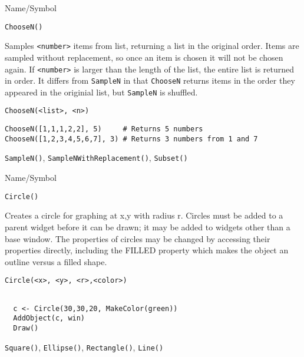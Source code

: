 \begin{desc}{Name/Symbol}
\item[Name/Symbol]  	\verb+ChooseN()+

\item[Description] Samples \verb+<number>+ items from list, returning
  a list in the original order. Items are sampled without replacement, so
  once an item is chosen it will not be chosen again. If
  \verb+<number>+ is larger than the length of the list, the entire
  list is returned in order.  It differs from \verb+SampleN+ in that
  \verb+ChooseN+ returns items in the order they appeared in the
  originial list, but \verb+SampleN+ is shuffled. 

\item[Usage]       	
\begin{verbatim}
ChooseN(<list>, <n>)
\end{verbatim}

\item[Example]   	
\begin{verbatim}
ChooseN([1,1,1,2,2], 5)     # Returns 5 numbers
ChooseN([1,2,3,4,5,6,7], 3) # Returns 3 numbers from 1 and 7
\end{verbatim}

\item[See Also]    	\verb+SampleN()+, \verb+SampleNWithReplacement()+, \verb+Subset()+
\end{desc}

\rl

\begin{desc}{Name/Symbol}
\item[Name/Symbol]	\verb+Circle()+

\item[Description] Creates a circle for graphing at x,y with radius r.
  Circles must be added to a parent widget before it can be drawn; it
  may be added to widgets other than a base window. The properties of
  circles may be changed by accessing their properties directly,
  including the FILLED property which makes the object an outline
  versus a filled shape.


\item[Usage]
\begin{verbatim}
Circle(<x>, <y>, <r>,<color>)
\end{verbatim}

\item[Example]	
\begin{verbatim}
  
  c <- Circle(30,30,20, MakeColor(green))
  AddObject(c, win)
  Draw()

\end{verbatim}
\item[See Also]	\verb+Square()+, \verb+Ellipse()+, \verb+Rectangle()+, \verb+Line()+
\end{desc}

